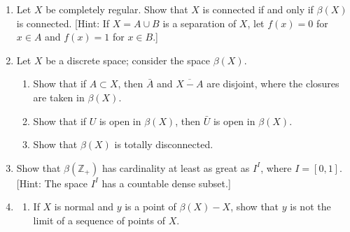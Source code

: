 \begin{enumerate}[itemsep=0.4em, parsep=0pt, topsep=0pt, partopsep=0pt, leftmargin=*, label=\arabic*., ref=\arabic*]
\begin{enumerate}[itemsep=0.2em, parsep=0pt, topsep=0pt, partopsep=0pt, leftmargin=*, label=(\alph*), align=left]
 \item Show that the one-point compactification of \(S_{\Omega }\) and the Stone-Čech compactification are equivalent.
 \item Conclude that every compactification of \(S_{\Omega }\) is equivalent to the one-point compactification.
 \end{enumerate}
\item Let \(X\) be completely regular. Show that \(X\) is connected if and only if \(\beta (X)\) is connected. [Hint: If \(X = A \cup B\) is a separation of \(X\), let \(f(x) = 0\) for \(x \in A\) and \(f(x) = 1\) for \(x \in B\).]
\item Let \(X\) be a discrete space; consider the space \(\beta (X)\).
 \begin{enumerate}[itemsep=0.2em, parsep=0pt, topsep=0pt, partopsep=0pt, leftmargin=*, label=(\alph*), align=left]
 \item Show that if \(A \subset X\), then \(\bar{A}\) and \(\overline{X - A}\) are disjoint, where the closures are taken in \(\beta (X)\).
 \item Show that if \(U\) is open in \(\beta (X)\), then \(\bar{U}\) is open in \(\beta (X)\).
 \item Show that \(\beta (X)\) is totally disconnected.
 \end{enumerate}
\item Show that \(\beta ( \mathbb{Z}_{ + })\) has cardinality at least as great as \(I^{I}\), where \(I = [ {0,1}]\). [Hint: The space \(I^{I}\) has a countable dense subset.]
\item
 \begin{enumerate}[itemsep=0.2em, parsep=0pt, topsep=0pt, partopsep=0pt, leftmargin=*, label=(\alph*), align=left]
 \item If \(X\) is normal and \(y\) is a point of \(\beta (X) - X\), show that \(y\) is not the limit of a sequence of points of \(X\).


\end{enumerate}
\end{enumerate}
